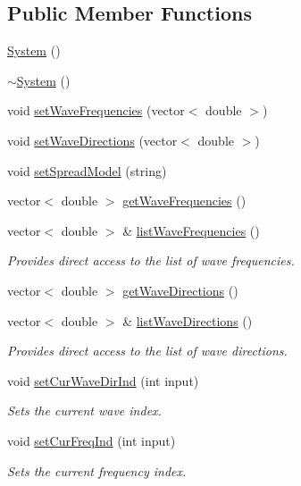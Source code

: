 \subsection*{Public Member Functions}
\begin{DoxyCompactItemize}
\item 
\hyperlink{class_system_ae317936c9bcf1374d61745572e0f2f8a}{System} ()
\item 
\hyperlink{class_system_a3be70bb338e3f062f821173fd15680d0}{$\sim$\-System} ()
\item 
void \hyperlink{class_system_ab1bfe916791d4c61bb807c930f73930c}{set\-Wave\-Frequencies} (vector$<$ double $>$)
\item 
void \hyperlink{class_system_a492b1dc5f789192ff6207f2555b23138}{set\-Wave\-Directions} (vector$<$ double $>$)
\item 
void \hyperlink{class_system_a2c26340bdbd94e6bed0f75dba991b49c}{set\-Spread\-Model} (string)
\item 
vector$<$ double $>$ \hyperlink{class_system_a18b18022b6468a41dfdbfc49c881b933}{get\-Wave\-Frequencies} ()
\item 
vector$<$ double $>$ \& \hyperlink{class_system_a02a78c7751da784608be2dc2afbb4022}{list\-Wave\-Frequencies} ()
\begin{DoxyCompactList}\small\item\em Provides direct access to the list of wave frequencies. \end{DoxyCompactList}\item 
vector$<$ double $>$ \hyperlink{class_system_a8e1d633a4b604223236e4cc4de35bd70}{get\-Wave\-Directions} ()
\item 
vector$<$ double $>$ \& \hyperlink{class_system_a18cbe26b239cf4ee83210ac6679f773f}{list\-Wave\-Directions} ()
\begin{DoxyCompactList}\small\item\em Provides direct access to the list of wave directions. \end{DoxyCompactList}\item 
void \hyperlink{class_system_a1bdee1bedde63db2d813fda1036f8299}{set\-Cur\-Wave\-Dir\-Ind} (int input)
\begin{DoxyCompactList}\small\item\em Sets the current wave index. \end{DoxyCompactList}\item 
void \hyperlink{class_system_a76c849ddc8e6d9cc628f4208df2ea950}{set\-Cur\-Freq\-Ind} (int input)
\begin{DoxyCompactList}\small\item\em Sets the current frequency index. \end{DoxyCompactList}\item 

\end{DoxyCompactItemize}
